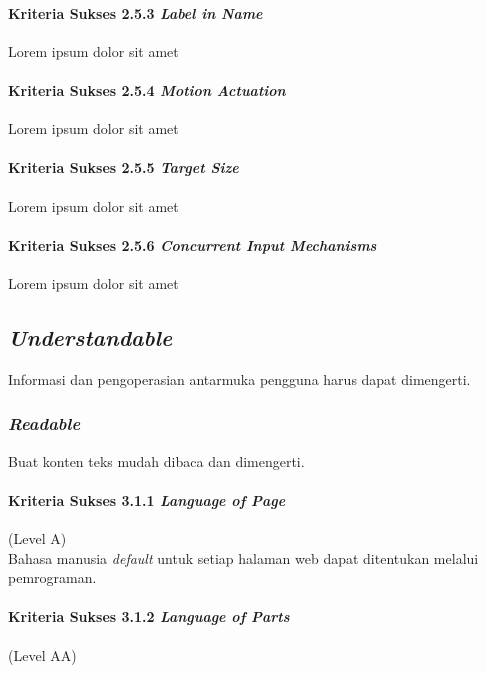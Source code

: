 \paragraph{Kriteria Sukses 2.5.3 \textit{Label in Name}}
\label{sec:kriteria_sukses_2.5.3}
Lorem ipsum dolor sit amet

\paragraph{Kriteria Sukses 2.5.4 \textit{Motion Actuation}}
\label{sec:kriteria_sukses_2.5.4}
Lorem ipsum dolor sit amet

\paragraph{Kriteria Sukses 2.5.5 \textit{Target Size}}
\label{sec:kriteria_sukses_2.5.5}
Lorem ipsum dolor sit amet

\paragraph{Kriteria Sukses 2.5.6 \textit{Concurrent Input Mechanisms}}
\label{sec:kriteria_sukses_2.5.6}
Lorem ipsum dolor sit amet


\subsection{\textit{Understandable}}
\label{sec:understandable}
Informasi dan pengoperasian antarmuka pengguna harus dapat dimengerti.

\subsubsection{\textit{Readable}}
\label{sec:readable}
Buat konten teks mudah dibaca dan dimengerti.

\paragraph{Kriteria Sukses 3.1.1 \textit{Language of Page}}
\label{sec:kriteria_sukses_3.1.1}
(Level A)\\

Bahasa manusia \textit{default} untuk setiap halaman web dapat ditentukan melalui pemrograman.

\paragraph{Kriteria Sukses 3.1.2 \textit{Language of Parts}}
\label{sec:kriteria_sukses_3.1.2}
(Level AA)\\

